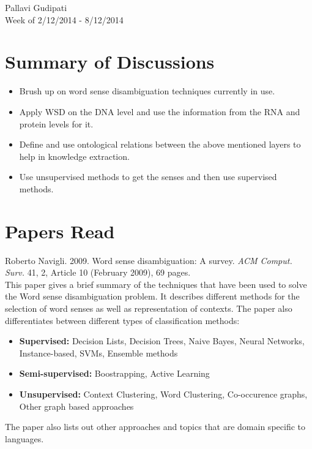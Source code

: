 \documentclass{article}[11pt]
\begin{document}
\begin{center}
Pallavi Gudipati\\
Week of 2/12/2014 - 8/12/2014
\end{center}
\section{Summary of Discussions}
\begin{itemize}
\item Brush up on word sense disambiguation techniques currently in use. 
\item Apply WSD on the DNA level and use the information from the RNA and protein levels for it.
\item Define and use ontological relations between the above mentioned layers to help in knowledge extraction.
\item Use unsupervised methods to get the senses and then use supervised methods.
\end{itemize}

\section{Papers Read}
Roberto Navigli. 2009. Word sense disambiguation: A survey. \textit{ACM Comput. Surv.} 41, 2, Article 10 (February 2009), 69 pages. \\[4pt]
This paper gives a brief summary of the techniques that have been used to solve the Word sense disambiguation problem. It describes different methods for the selection of word senses as well as representation of contexts. The paper also differentiates between different types of classification methods:
\begin{itemize}
\item \textbf{Supervised:} Decision Lists, Decision Trees, Naive Bayes, Neural Networks, Instance-based, SVMs, Ensemble methods
\item \textbf{Semi-supervised:} Boostrapping, Active Learning
\item \textbf{Unsupervised:} Context Clustering, Word Clustering, Co-occurence graphs, Other graph based approaches
\end{itemize}
The paper also lists out other approaches and topics that are domain specific to languages.

\end{document}
